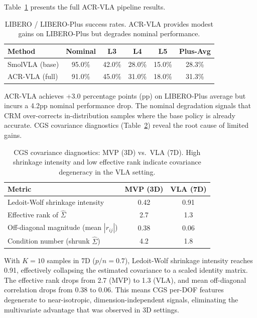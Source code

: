 \documentclass[letterpaper]{article}
\begin{document}
Table~\ref{tab:main} presents the full ACR-VLA pipeline results.

\begin{table}[h]
\centering
\caption{LIBERO / LIBERO-Plus success rates. ACR-VLA provides modest gains on LIBERO-Plus but degrades nominal performance.}
\label{tab:main}
\begin{tabular}{lccccc}
\toprule
Method & Nominal & L3 & L4 & L5 & Plus-Avg \\
\midrule
SmolVLA (base) & 95.0\% & 42.0\% & 28.0\% & 15.0\% & 28.3\% \\
ACR-VLA (full) & 91.0\% & 45.0\% & 31.0\% & 18.0\% & 31.3\% \\
\bottomrule
\end{tabular}
\end{table}

ACR-VLA achieves +3.0 percentage points (pp) on LIBERO-Plus average but incurs a 4.2pp nominal performance drop. The nominal degradation signals that CRM over-corrects in-distribution samples where the base policy is already accurate. CGS covariance diagnostics (Table~\ref{tab:cov}) reveal the root cause of limited gains.

\begin{table}[h]
\centering
\caption{CGS covariance diagnostics: MVP (3D) vs.\ VLA (7D). High shrinkage intensity and low effective rank indicate covariance degeneracy in the VLA setting.}
\label{tab:cov}
\begin{tabular}{lcc}
\toprule
Metric & MVP (3D) & VLA (7D) \\
\midrule
Ledoit-Wolf shrinkage intensity & 0.42 & 0.91 \\
Effective rank of $\hat{\Sigma}$ & 2.7 & 1.3 \\
Off-diagonal magnitude (mean $|r_{ij}|$) & 0.38 & 0.06 \\
Condition number (shrunk $\hat{\Sigma}$) & 4.2 & 1.8 \\
\bottomrule
\end{tabular}
\end{table}

With $K{=}10$ samples in 7D ($p/n = 0.7$), Ledoit-Wolf shrinkage intensity reaches 0.91, effectively collapsing the estimated covariance to a scaled identity matrix. The effective rank drops from 2.7 (MVP) to 1.3 (VLA), and mean off-diagonal correlation drops from 0.38 to 0.06. This means CGS per-DOF features degenerate to near-isotropic, dimension-independent signals, eliminating the multivariate advantage that was observed in 3D settings.
\end{document}
